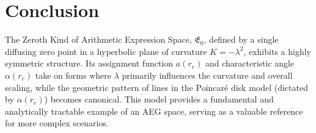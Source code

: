 \documentclass{article}
\begin{document}
\section{Conclusion}
The Zeroth Kind of Arithmetic Expression Space, $\mathfrak{E}_0$, defined by a single diffusing zero point in a hyperbolic plane of curvature $K=-\lambda^2$, exhibits a highly symmetric structure. Its assignment function $a(r_e)$ and characteristic angle $\alpha(r_e)$ take on forms where $\lambda$ primarily influences the curvature and overall scaling, while the geometric pattern of lines in the Poincaré disk model (dictated by $\alpha(r_e)$) becomes canonical. This model provides a fundamental and analytically tractable example of an AEG space, serving as a valuable reference for more complex scenarios.
\end{document}

